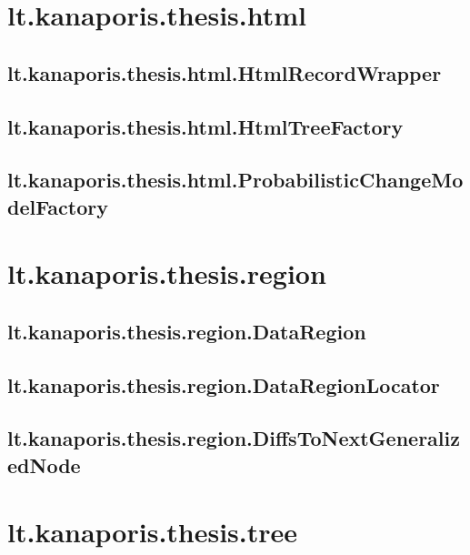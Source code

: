 \section{lt.kanaporis.thesis.html}

\subsection{lt.kanaporis.thesis.html.HtmlRecordWrapper}


\subsection{lt.kanaporis.thesis.html.HtmlTreeFactory}


\subsection{lt.kanaporis.thesis.html.ProbabilisticChangeModelFactory}



\section{lt.kanaporis.thesis.region}

\subsection{lt.kanaporis.thesis.region.DataRegion}


\subsection{lt.kanaporis.thesis.region.DataRegionLocator}


\subsection{lt.kanaporis.thesis.region.DiffsToNextGeneralizedNode}



\section{lt.kanaporis.thesis.tree}

